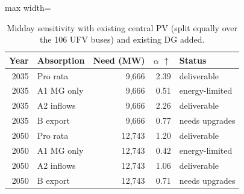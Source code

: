\begin{table}[!htbp]
\centering
\small
\caption{Midday sensitivity with existing central PV (split equally over the 106 UFV buses) and existing DG added.}
\label{tab:existingpv}
\begin{adjustbox}{max width=\linewidth}
\begin{tabular}{rlrrl}
\toprule
Year & Absorption & Need (MW) & $\alpha$ $\uparrow$ & Status \\
\midrule
2035 & Pro rata & 9,666 & 2.39 & deliverable \\
2035 & A1 MG only & 9,666 & 0.51 & energy-limited \\
2035 & A2 inflows & 9,666 & 2.26 & deliverable \\
2035 & B export & 9,666 & 0.77 & needs upgrades \\
2050 & Pro rata & 12,743 & 1.20 & deliverable \\
2050 & A1 MG only & 12,743 & 0.42 & energy-limited \\
2050 & A2 inflows & 12,743 & 1.06 & deliverable \\
2050 & B export & 12,743 & 0.71 & needs upgrades \\
\bottomrule
\end{tabular}
\end{adjustbox}
\end{table}
